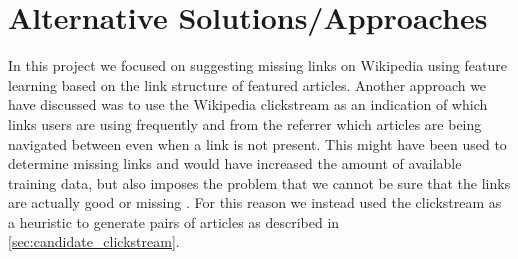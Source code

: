 \section{Alternative Solutions/Approaches}
In this project we focused on suggesting missing links on Wikipedia using feature learning based on the link structure of featured articles.
Another approach we have discussed was to use the Wikipedia clickstream as an indication of which links users are using frequently and from the referrer which articles are being navigated between even when a link is not present. This might have been used to determine missing links and would have increased the amount of available training data, but also imposes the problem that we cannot be sure that the links are actually good or missing . For this reason we instead used the clickstream as a heuristic to generate pairs of articles as described in \cref{sec:candidate_clickstream}.








